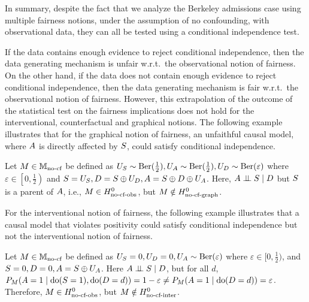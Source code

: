 In summary, despite the fact that we analyze the Berkeley admissions case using multiple fairness notions, under the assumption of no confounding, with observational data, they can all be tested using a conditional independence test. 

If the data contains enough evidence to reject conditional independence, then the data generating mechanism is unfair w.r.t.\ the observational notion of fairness. On the other hand, if the data does not contain enough evidence to reject conditional independence, then the data generating mechanism is fair w.r.t.\ the observational notion of fairness. However, this extrapolation of the outcome of the statistical test on the fairness implications does not hold for the interventional, counterfactual and graphical notions. The following example illustrates that for the graphical notion of fairness, an unfaithful causal model, where $A$ is directly affected by $S$, could satisfy conditional independence. 
\begin{example}\label{ex:unconfexample}
   Let $M \in \mathbb{M}_{\text{no-cf}}$ be defined as $U_{S} \sim \text{Ber}(\frac{1}{2}), U_{A} \sim \text{Ber}(\frac{1}{2}), U_{D} \sim \text{Ber}(\varepsilon)$ where $\varepsilon \in \left[0,\frac{1}{2}\right)$ and $S = U_{S}, D=S \oplus U_{D}, A = S \oplus D \oplus U_{A}$. Here, $A \perp\!\!\!\perp S \mid D$ but $S$ is a parent of $A$, i.e., $M \in H^0_{\text{no-cf-obs}}$, but $M \notin H^0_{\text{no-cf-graph}}$. 
\end{example}
For the interventional notion of fairness, the following example illustrates that a causal model that violates positivity could satisfy conditional independence but not the interventional notion of fairness.
\begin{example}\label{ex:posexample}
    Let $M \in \mathbb{M}_{\text{no-cf}}$ be defined as $U_{S}=0, U_{D}=0,U_{A} \sim \text{Ber}{\left({\varepsilon}\right)}$ where $\varepsilon \in [0,\frac{1}{2})$, and $S=0,D=0,A=S \oplus U_A$. Here $A \perp\!\!\!\perp S \mid D$, but 
 for all $d$, $P_{M}{\left({A = 1 \mid \text{do}(S=1), \text{do}(D=d)}\right)} = 1-\varepsilon \neq P_{M}{\left({A = 1 \mid \text{do}(D=d)}\right)} = \varepsilon$. Therefore, $M \in H^0_{\text{no-cf-obs}}$, but $M \notin H^0_{\text{no-cf-inter}}$.
\end{example}

